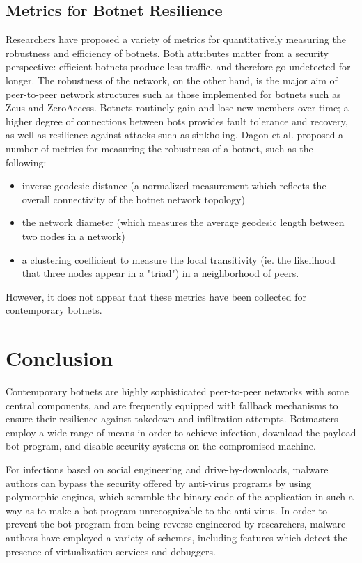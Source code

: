 \documentclass{acm_proc_article-sp}
\begin{document}
\subsection{Metrics for Botnet Resilience}

Researchers have proposed a variety of metrics for quantitatively measuring the robustness and efficiency of botnets.  Both attributes matter from a security perspective: efficient botnets produce less traffic, and therefore go undetected for longer.  The robustness of the network, on the other hand, is the major aim of peer-to-peer network structures such as those implemented for botnets such as Zeus and ZeroAccess.  Botnets routinely gain and lose new members over time; a higher degree of connections between bots provides fault tolerance and recovery, as well as resilience against attacks such as sinkholing\cite{botnet:metrics}.  Dagon et al. proposed a number of metrics for measuring the robustness of a botnet, such as the following:

\begin{itemize}
\item inverse geodesic distance (a normalized measurement which reflects the overall connectivity of the botnet network topology)
\item the network diameter (which measures the average geodesic length between two nodes in a network)
\item a clustering coefficient to measure the local transitivity (ie. the likelihood that three nodes appear in a "triad") in a neighborhood of peers.
\end{itemize}

However, it does not appear that these metrics have been collected for contemporary botnets.

\section{Conclusion}

Contemporary botnets are highly sophisticated peer-to-peer networks with some central components, and are frequently equipped with fallback mechanisms to ensure their resilience against takedown and infiltration attempts.  Botmasters employ a wide range of means in order to achieve infection, download the payload bot program, and disable security systems on the compromised machine.

For infections based on social engineering and drive-by-downloads, malware authors can bypass the security offered by anti-virus programs by using polymorphic engines, which scramble the binary code of the application in such a way as to make a bot program unrecognizable to the anti-virus.  In order to prevent the bot program from being reverse-engineered by researchers, malware authors have employed a variety of schemes, including features which detect the presence of virtualization services and debuggers.
\end{document}
